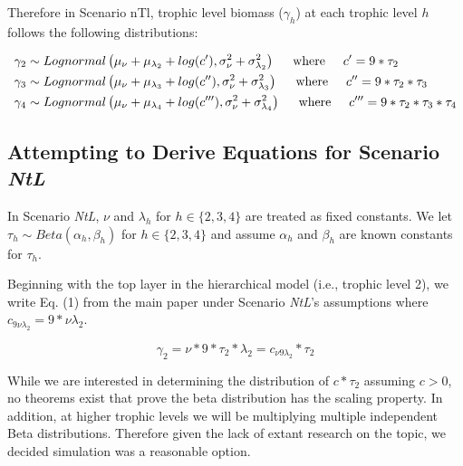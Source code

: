 \documentclass[oneside,12pt,final]{sty/ucthesis-CA2012}
\begin{document}
\begin{mainmatter}
\vspace{5mm}

Therefore in Scenario nTl, trophic level biomass ($\gamma_h$) at each trophic level $h$ follows the following distributions:

\begin{equation}
\begin{split}
\gamma_2 & \sim Lognormal \left( \mu_\nu + \mu_{\lambda_2} + log(c'), \sigma^2_\nu+\sigma^2_{\lambda_2} \right) \hspace{5mm} \text{where} \hspace{5mm} c' = 9*\tau_2 \\
\gamma_3 & \sim Lognormal \left( \mu_\nu + \mu_{\lambda_3} + log(c''), \sigma^2_\nu+\sigma^2_{\lambda_3} \right) \hspace{5mm} \text{where} \hspace{5mm} c'' = 9*\tau_2*\tau_3 \\
\gamma_4 & \sim Lognormal \left( \mu_\nu + \mu_{\lambda_4} + log(c'''), \sigma^2_\nu+\sigma^2_{\lambda_4} \right) \hspace{5mm} \text{where} \hspace{5mm} c''' = 9*\tau_2*\tau_3*\tau_4 \\
\end{split}
\end{equation}

\subsection{Attempting to Derive Equations for Scenario \textit{NtL}}
In Scenario \textit{NtL}, $\nu$ and $\lambda_h$ for $h \in \{2, 3, 4\}$ are treated as fixed constants. We let $\tau_h \sim Beta(\alpha_h, \beta_h)$ for $h \in \{2, 3, 4\}$ and assume $\alpha_h$ and $\beta_h$ are known constants for $\tau_h$.

\vspace{5mm}

Beginning with the top layer in the hierarchical model (i.e., trophic level 2), we write Eq. (1) from the main paper under Scenario \textit{NtL}'s assumptions where $c_{9\nu\lambda_2}=9*\nu\lambda_2$.

\begin{equation*}
\gamma_2 = \nu * 9 * \tau_2 *\lambda_2 = c_{\nu9\lambda_2}*\tau_2 
\end{equation*}

While we are interested in determining the distribution of $c*\tau_2$ assuming $c>0$,  no theorems exist that prove the beta distribution has the scaling property. In addition, at higher trophic levels we will be multiplying multiple independent Beta distributions. Therefore given the lack of extant research on the topic, we decided simulation was a reasonable option. 


\end{mainmatter}
\end{document}
